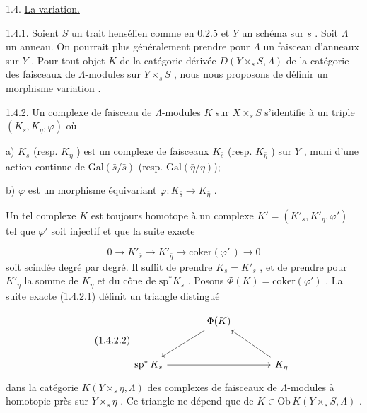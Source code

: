 1.4. \underline{La variation.}

1.4.1. Soient $S$ un trait hensélien comme en 0.2.5 et $Y$ un schéma sur $s$ . Soit $\Lambda$ un anneau. On pourrait plus généralement prendre pour $\Lambda$ un faisceau d'anneaux sur $Y$ . Pour tout objet $K$ de la catégorie dérivée $D(Y \times_s S, \Lambda)$ de la catégorie des faisceaux de $\Lambda$-modules sur $Y \times_s S$ , nous nous proposons de définir un morphisme \underline{variation} .

1.4.2. Un complexe de faisceau de $\Lambda$-modules $K$ sur $X \times_s S$ s'identifie à un triple $(K_s, K_\eta , \varphi)$ où

a) $K_s$ (resp. $K_\eta$ ) est un complexe de faisceaux $K_{\bar{s}}$ (resp. $K_{\bar{\eta}}$ ) sur $\bar{Y}$ , muni d'une action continue de $\mathrm{Gal}(\bar{s}/\bar{s})$ (resp. $\mathrm{Gal}(\bar{\eta}/\eta)$);

b) $\varphi$ est un morphisme équivariant $\varphi\colon K_{\bar{s}} \to K_{\bar{\eta}}$ .

Un tel complexe $K$ est toujours homotope à un complexe $K' = (K'_s, K'_\eta , \varphi')$ tel que $\varphi'$ soit injectif et que la suite exacte

\begin{equation}\tag{1.4.2.1}
0 \longrightarrow K'_{\bar{s}} \longrightarrow K'_{\bar{\eta}} \longrightarrow \mathrm{coker}(\varphi'\,) \longrightarrow 0
\end{equation}
soit scindée degré par degré. Il suffit de prendre $K_s = K'_s$ , et de prendre pour $K'_\eta$ la somme de $K_\eta$ et du cône de $\mathrm{sp}^* K_s$ . Posons $\Phi(K) = \mathrm{coker}(\varphi')$ . La suite exacte (1.4.2.1) définit un triangle distingué

\begin{equation}\tag{1.4.2.2}
\begin{tikzcd}[column sep=large, row sep=large]
& \Phi(K) \arrow[dl] & \\
\mathrm{sp}^*\, K_s \arrow[rr] & & K_\eta \arrow[ul]
\end{tikzcd}
\end{equation}
dans la catégorie $K(Y \times_s \eta , \Lambda)$ des complexes de faisceaux de $\Lambda$-modules à homotopie près sur $Y \times_s \eta$ . Ce triangle ne dépend que de $K \in \mathrm{Ob}\, K(Y \times_s S, \Lambda)$ .


